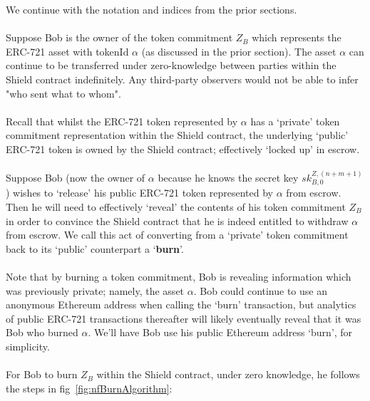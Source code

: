 \documentclass{article}
\begin{document}
We continue with the notation and indices from the prior sections.\\
\\
Suppose Bob is the owner of the token commitment $Z_B$ which represents the ERC-721 asset with tokenId $\alpha$ (as discussed in the prior section).
The asset $\alpha$ can continue to be transferred under zero-knowledge between parties within the Shield contract indefinitely.
Any third-party observers would not be able to infer "who sent what to whom".\\
\\
Recall that whilst the ERC-721 token represented by $\alpha$ has a `private' token commitment representation within the Shield contract, the underlying `public' ERC-721 token is owned by the Shield contract; effectively `locked up' in escrow.\\
\\
Suppose Bob (now the owner of $\alpha$ because he knows the secret key $sk^{Z,(n+m+1)}_{B,0}$) wishes to `release' his public ERC-721 token represented by $\alpha$ from escrow.
Then he will need to effectively `reveal' the contents of his token commitment $Z_B$ in order to convince the Shield contract that he is indeed entitled to withdraw $\alpha$ from escrow.
We call this act of converting from a `private' token commitment back to its `public' counterpart a `\textbf{burn}'.\\
\\
Note that by burning a token commitment, Bob is revealing information which was previously private; namely, the asset $\alpha$. Bob could continue to use an anonymous Ethereum address when calling the `burn' transaction, but analytics of public ERC-721 transactions thereafter will likely eventually reveal that it was Bob who burned $\alpha$. We'll have Bob use his public Ethereum address `burn', for simplicity.\\
\\

\noindent
For Bob to burn $Z_B$ within the Shield contract, under zero knowledge, he follows the steps in fig~\ref{fig:nfBurnAlgorithm}:
\end{document}
